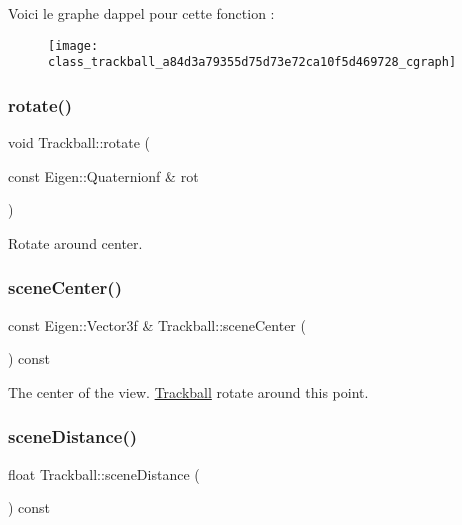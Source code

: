 Voici le graphe d\textquotesingle{}appel pour cette fonction \+:
\nopagebreak
\begin{figure}[H]
\begin{center}
\leavevmode
\texttt{[image: class\_trackball\_a84d3a79355d75d73e72ca10f5d469728\_cgraph]}
\end{center}
\end{figure}
\mbox{\label{class_trackball_aa0dee57906be9ccd12183d0d6e820c3d}} 
\subsubsection{\texorpdfstring{rotate()}{rotate()}}
{\footnotesize\ttfamily void Trackball\+::rotate (\begin{DoxyParamCaption}\item[{const Eigen\+::\+Quaternionf \&}]{rot }\end{DoxyParamCaption})}



Rotate around {\ttfamily center}. 

\mbox{\label{class_trackball_ad658224ce2f6a47a1f607852c887654b}} 
\subsubsection{\texorpdfstring{scene\+Center()}{sceneCenter()}}
{\footnotesize\ttfamily const Eigen\+::\+Vector3f \& Trackball\+::scene\+Center (\begin{DoxyParamCaption}{ }\end{DoxyParamCaption}) const}



The center of the view. \hyperlink{class_trackball}{Trackball} rotate around this point. 

\mbox{\label{class_trackball_a9b40eb48561c425f30498a8a9f10ca1f}} 
\subsubsection{\texorpdfstring{scene\+Distance()}{sceneDistance()}}
{\footnotesize\ttfamily float Trackball\+::scene\+Distance (\begin{DoxyParamCaption}{ }\end{DoxyParamCaption}) const}



